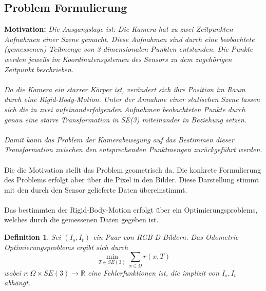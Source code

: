 \documentclass[12pt,DIV=15,BCOR=15mm,twoside,headsepline,abstract=true,listof=totoc,bibliography=totoc]{scrreprt}
\newtheorem{defi}{Definition}
\theoremstyle{remark}    %
\begin{document}
    \subsection{Problem Formulierung}
    \textbf{Motivation:} \emph{\label{mot:odom}Die Ausgangslage ist: Die Kamera hat zu zwei Zeitpunkten Aufnahmen einer Szene gemacht. Diese Aufnahmen sind durch
    eine beobachtete (gemessenen) Teilmenge von 3-dimensionalen Punkten entstanden. Die Punkte werden jeweils im Koordinatensystemen des Sensors zu dem zugehörigen
    Zeitpunkt beschrieben.\\\\
    Da die Kamera ein starrer Körper ist, verändert sich ihre Position im Raum durch eine Rigid-Body-Motion.
    Unter der Annahme einer statischen Szene lassen sich die in zwei aufeinanderfolgenden Aufnahmen beobachteten Punkte durch genau eine starre Transformation in SE(3) 
    miteinander in Beziehung setzen.\\\\
    Damit kann das Problem der Kamerabewegung auf das Bestimmen dieser Transformation zwischen den entsprechenden Punktmengen zurückgeführt werden.}\\\\
    Die die Motivation stellt das Problem geometrisch da. Die konkrete Formulierung des Problems erfolgt aber über die Pixel in den Bilder. Diese Darstellung stimmt 
    mit den durch den Sensor gelieferte Daten übereinstimmt.\\\\
    Das bestimmten der Rigid-Body-Motion erfolgt über ein Optimierungsproblems, welches durch die gemessenen Daten gegeben ist.
    \begin{defi}\label{def:odom}
        Sei  $(I_s, I_t)$ ein Paar von RGB-D-Bildern. Das Odometrie Optimierungsproblems ergibt sich durch
        \[\min_{T \in SE(3)} \sum_{x \in \Omega} r(x, T) \]
        wobei $r: \Omega \times SE(3) \to \mathbb{R}$ eine Fehlerfunktionen ist, die implizit von  $I_s, I_t$
        abhängt. \cite{steinbruecker2011real}\cite{Park_2017_ICCV}
    \end{defi}
    
\end{document}
